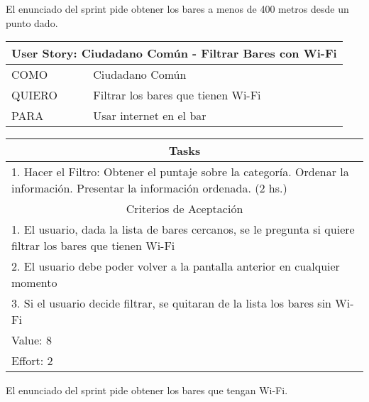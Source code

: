      El enunciado del sprint pide obtener los bares a menos de 400 metros desde un punto dado. \\
    
    \begin{table}[H]
        \centering
        \begin{tabular}{| p{1.5cm}| p{10.2cm} |}
            \hline
            \multicolumn{2}{|c|}{User Story: Ciudadano Común - Filtrar Bares con Wi-Fi} \\
            \hline
            COMO & Ciudadano Común \\ \hline
            QUIERO & Filtrar los bares que tienen Wi-Fi \\ \hline
            PARA & Usar internet en el bar \\ \hline
            \hline
        \end{tabular}
        \begin{tabular}{| p{12.118cm} |}
            \multicolumn{1}{|c|}{Tasks} \\
            \hline
            1. Hacer el Filtro: Obtener el puntaje sobre la categoría. Ordenar la información. Presentar la información ordenada. (2 hs.)\\ \hline
            \hline
            \multicolumn{1}{|c|}{Criterios de Aceptación} \\
            \hline
            1. El usuario, dada la lista de bares cercanos, se le pregunta si quiere filtrar los bares que tienen Wi-Fi \\ \hline
            2. El usuario debe poder volver a la pantalla anterior en cualquier momento \\ \hline
            3. Si el usuario decide filtrar, se quitaran de la lista los bares sin Wi-Fi \\ \hline
            Value: 8 \\ \hline
            Effort: 2 \\ \hline
        \end{tabular}
    \end{table}
    
     El enunciado del sprint pide obtener los bares que tengan Wi-Fi. \\
    




